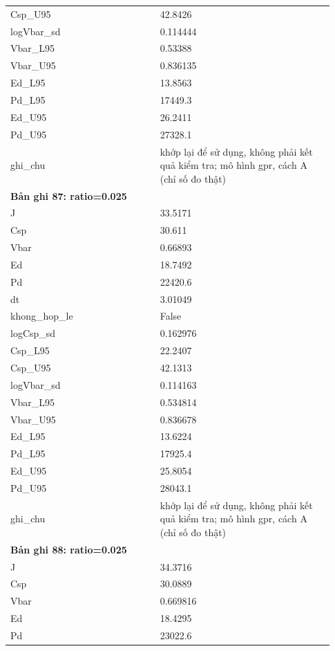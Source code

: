 \begin{longtable}{p{0.43\linewidth}p{0.50\linewidth}}
Csp\_\allowbreak U95 & 42.8426 \\
logVbar\_\allowbreak sd & 0.114444 \\
Vbar\_\allowbreak L95 & 0.53388 \\
Vbar\_\allowbreak U95 & 0.836135 \\
Ed\_\allowbreak L95 & 13.8563 \\
Pd\_\allowbreak L95 & 17449.3 \\
Ed\_\allowbreak U95 & 26.2411 \\
Pd\_\allowbreak U95 & 27328.1 \\
ghi\_\allowbreak chu & khớp lại để sử dụng, không phải kết quả kiểm tra; mô hình gpr, cách A (chỉ số đo thật) \\
\midrule
\multicolumn{2}{p{0.95\linewidth}}{\textbf{Bản ghi 87: ratio=0.025}} \\
J & 33.5171 \\
Csp & 30.611 \\
Vbar & 0.66893 \\
Ed & 18.7492 \\
Pd & 22420.6 \\
dt & 3.01049 \\
khong\_\allowbreak hop\_\allowbreak le & False \\
logCsp\_\allowbreak sd & 0.162976 \\
Csp\_\allowbreak L95 & 22.2407 \\
Csp\_\allowbreak U95 & 42.1313 \\
logVbar\_\allowbreak sd & 0.114163 \\
Vbar\_\allowbreak L95 & 0.534814 \\
Vbar\_\allowbreak U95 & 0.836678 \\
Ed\_\allowbreak L95 & 13.6224 \\
Pd\_\allowbreak L95 & 17925.4 \\
Ed\_\allowbreak U95 & 25.8054 \\
Pd\_\allowbreak U95 & 28043.1 \\
ghi\_\allowbreak chu & khớp lại để sử dụng, không phải kết quả kiểm tra; mô hình gpr, cách A (chỉ số đo thật) \\
\midrule
\multicolumn{2}{p{0.95\linewidth}}{\textbf{Bản ghi 88: ratio=0.025}} \\
J & 34.3716 \\
Csp & 30.0889 \\
Vbar & 0.669816 \\
Ed & 18.4295 \\
Pd & 23022.6 \\

\end{longtable}
